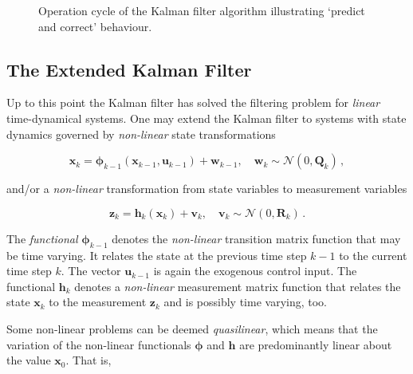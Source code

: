 \begin{figure}[t]
\caption{Operation cycle of the Kalman filter algorithm illustrating `predict and correct' behaviour.} \label{fig:kalman_filter_cycle}
\end{figure}


\subsection{The Extended Kalman Filter}

Up to this point the Kalman filter has solved the filtering problem for \emph{linear} time-dynamical systems. One may extend the Kalman filter to systems with state dynamics governed by \emph{non-linear} state transformations

\begin{equation}\label{eq:time_dynamical_system_plant_extended}
  \mathbf{x}_k = \bm{\phi}_{k-1}(\mathbf{x}_{k-1}, \mathbf{u}_{k-1})+\mathbf{w}_{k-1}, \quad \mathbf{w}_{k} \sim \mathcal{N}(0,\mathbf{Q}_k)\,,
\end{equation}

\noindent
and/or a \emph{non-linear} transformation from state variables to measurement variables

\begin{equation}\label{eq:time_dynamical_system_measurement_extended}
  \mathbf{z}_k = \mathbf{h}_{k}(\mathbf{x}_{k})+\mathbf{v}_{k}, \quad \mathbf{v}_{k} \sim \mathcal{N}(0,\mathbf{R}_k)\,.
\end{equation}

\noindent
The \emph{functional} $\bm{\phi}_{k-1}$ denotes the \emph{non-linear} transition matrix function that may be time varying. It relates the state at the previous time step $k-1$ to the current time step $k$. The vector $\mathbf{u}_{k-1}$ is again the exogenous control input. The functional $\mathbf{h}_{k}$ denotes a \emph{non-linear} measurement matrix function that relates the state $\mathbf{x}_{k}$ to the measurement $\mathbf{z}_k$ and is possibly time varying, too.

Some non-linear problems can be deemed \emph{quasilinear}, which means that the variation of the non-linear functionals $\bm{\phi}$ and $\mathbf{h}$ are predominantly linear about the value $\mathbf{x}_0$. That is,

